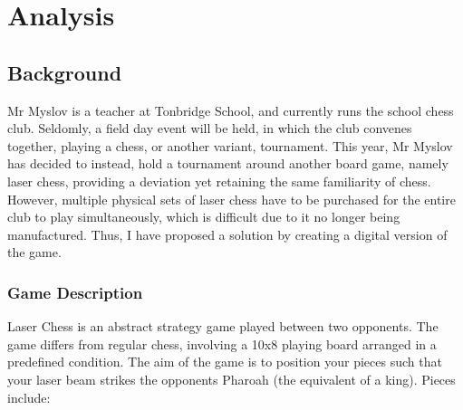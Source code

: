 \documentclass[../main/main.tex]{subfiles}
\begin{document}
\newpage

\section{Analysis}
\subsection{Background}
Mr Myslov is a teacher at Tonbridge School, and currently runs the school chess club. Seldomly, a field day event will be held, in which the club convenes together, playing a chess, or another variant, tournament. This year, Mr Myslov has decided to instead, hold a tournament around another board game, namely laser chess, providing a deviation yet retaining the same familiarity of chess. However, multiple physical sets of laser chess have to be purchased for the entire club to play simultaneously, which is difficult due to it no longer being manufactured. Thus, I have proposed a solution by creating a digital version of the game.

\subsubsection{Game Description}
Laser Chess is an abstract strategy game played between two opponents. The game differs from regular chess, involving a 10x8 playing board arranged in a predefined condition. The aim of the game is to position your pieces such that your laser beam strikes the opponents Pharoah (the equivalent of a king). Pieces include:
\end{document}
